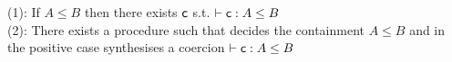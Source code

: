 \begin{corollary}
(1): If $A \leq B$ then there exists $\mathsf{c}$ s.t. $\vdash \mathsf{c} : A \leq B$\\
(2): There exists a procedure such that decides the containment $ A \leq B$ and in the positive case synthesises a coercion $\vdash \mathsf{c} : A \leq B$
\end{corollary}










